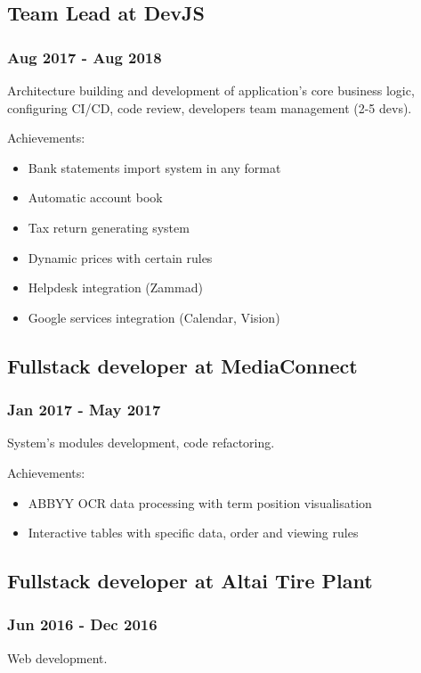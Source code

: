 \documentclass[letterpaper]{article}
\begin{document}
\subsection{Team Lead at DevJS}
\label{sec:org6801efd}
\subsubsection{Aug 2017 - Aug 2018}
\label{sec:org10e27f9}
Architecture building and development of application's core business logic, configuring CI/CD, code review, developers team management (2-5 devs).

Achievements:
\begin{itemize}
\item Bank statements import system in any format
\item Automatic account book
\item Tax return generating system
\item Dynamic prices with certain rules
\item Helpdesk integration (Zammad)
\item Google services integration (Calendar, Vision)
\end{itemize}

\subsection{Fullstack developer at MediaConnect}
\label{sec:org1fe71d1}
\subsubsection{Jan 2017 - May 2017}
\label{sec:org852a154}
System's modules development, code refactoring.

Achievements:
\begin{itemize}
\item ABBYY OCR data processing with term position visualisation
\item Interactive tables with specific data, order and viewing rules
\end{itemize}

\subsection{Fullstack developer at Altai Tire Plant}
\label{sec:org0b8c9b5}
\subsubsection{Jun 2016 - Dec 2016}
\label{sec:orgfb52538}
Web development.
\end{document}
